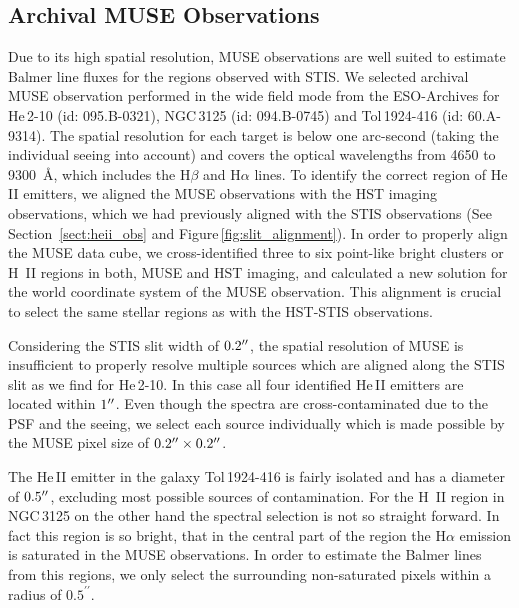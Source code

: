 \documentclass[linenumbers]{aastex63}
\begin{document}
\subsection{Archival MUSE Observations}\label{sssect:muse}
Due to its high spatial resolution, MUSE observations are well suited to estimate Balmer line fluxes for the regions observed with STIS.
We selected archival MUSE observation performed in the wide field mode from the ESO-Archives for He\,2-10 (id: 095.B-0321), NGC\,3125 (id: 094.B-0745) and Tol\,1924-416 (id: 60.A-9314). 
The spatial resolution for each target is below one arc-second (taking the individual seeing into account) and covers the optical wavelengths from 4650 to 9300~\AA, which includes the H$\beta$ and H$\alpha$ lines.
To identify the correct region of He\,II emitters, we aligned the MUSE observations with the HST imaging observations, which we had previously aligned with the STIS observations (See Section~\ref{sect:heii_obs} and Figure\,\ref{fig:slit_alignment}). In order to properly align the MUSE data cube, we cross-identified three to six point-like bright clusters or H~II regions in both, MUSE and HST imaging, and calculated a new solution for the world coordinate system of the MUSE observation. This alignment is crucial to select the same stellar regions as with the HST-STIS observations.

Considering the STIS slit width of $0.2\mbox{$^{\prime\prime}$}$, the spatial resolution of MUSE is insufficient to properly resolve multiple sources which are aligned along the STIS slit as we find for He\,2-10. In this case all four identified He\,II emitters are located within $1\mbox{$^{\prime\prime}$}$. Even though the spectra are cross-contaminated due to the PSF and the seeing, we select each source individually which is made possible by the MUSE pixel size of $0.2\mbox{$^{\prime\prime}$}\times0.2\mbox{$^{\prime\prime}$}$.

The He\,II emitter in the galaxy Tol\,1924-416 is fairly isolated and has a diameter of $0.5\mbox{$^{\prime\prime}$}$, excluding most possible sources of contamination.
For the H~II region in NGC\,3125 on the other hand the spectral selection is not so straight forward. In fact this region is so bright, that in the central part of the region the H$\alpha$ emission is saturated in the MUSE observations. In order to estimate the Balmer lines from this regions, we only select the surrounding non-saturated pixels within a radius of $0.5^{\prime\prime}$.
\end{document}
